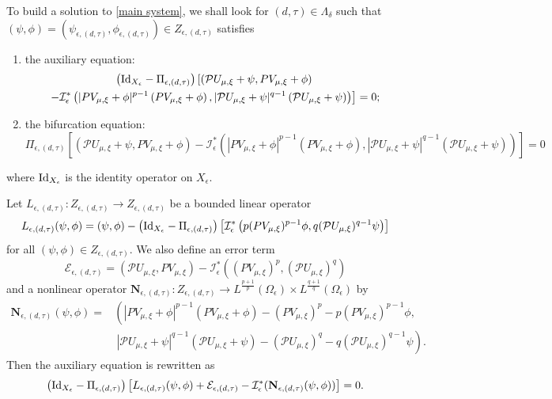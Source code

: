 \documentclass[reqno]{amsart}
\theoremstyle{remark}
\newcommand{\ep}{\epsilon}
\newcommand{\mbN}{\mathbf{N}}
\newcommand{\mce}{\mathcal{E}}
\newcommand{\mci}{\mathcal{I}}
\newcommand{\mcp}{\mathcal{P}}
\newcommand{\mx}{{\mu,\xi}}
\renewcommand{\(}{\left(}
\renewcommand{\)}{\right)}
\numberwithin{equation}{section}
\begin{document}
To build a solution to \eqref{main system}, we shall look for $(d,\tau) \in \Lambda_\delta$ such that $(\psi,\phi) = (\psi_{\ep,(d,\tau)},\phi_{\ep,(d,\tau)}) \in Z_{\ep,(d,\tau)}$ satisfies
\begin{enumerate}
\item the auxiliary equation:
\begin{multline}\label{aux eq}
\(\textup{Id}_{X_\ep}-\Pi_{\ep,(d,\tau)}\) \left[\(\mcp U_\mx+\psi, PV_\mx+\phi\) \right.\\
\left. - \mci^*_\ep\(|PV_\mx+\phi|^{p-1} \(PV_\mx+\phi\), |\mcp U_\mx+\psi|^{q-1} \(\mcp U_\mx+\psi\)\)\right] = 0;
\end{multline}
\item the bifurcation equation:
\[\Pi_{\ep,(d,\tau)} \left[\(\mcp U_\mx+\psi, PV_\mx+\phi\) - \mci^*_\ep\(|PV_\mx+\phi|^{p-1} \(PV_\mx+\phi\), |\mcp U_\mx+\psi|^{q-1} \(\mcp U_\mx+\psi\)\)\right] = 0\]
\end{enumerate}
where $\textup{Id}_{X_\ep}$ is the identity operator on $X_\ep$.

Let $L_{\ep,(d,\tau)}: Z_{\ep,(d,\tau)} \to Z_{\ep,(d,\tau)}$ be a bounded linear operator
\begin{equation}\label{lin op}
L_{\ep,(d,\tau)}(\psi,\phi) = (\psi,\phi) - \(\textup{Id}_{X_\ep}-\Pi_{\ep,(d,\tau)}\) \left[\mci^\ast_\ep\(p(PV_\mx)^{p-1}\phi, q(\mcp U_\mx)^{q-1}\psi\)\right]
\end{equation}
for all $(\psi,\phi) \in Z_{\ep,(d,\tau)}$. We also define an error term
\begin{equation}\label{error}
\mce_{\ep,(d,\tau)} = (\mcp U_\mx,PV_\mx) - \mci^*_\ep\((PV_\mx)^p,(\mcp U_\mx)^q\)
\end{equation}
and a nonlinear operator $\mbN_{\ep,(d,\tau)}: Z_{\ep,(d,\tau)} \to L^{\frac{p+1}{p}}(\Omega_\ep)\times L^{\frac{q+1}{q}}(\Omega_\ep)$ by
\begin{align*}
\mbN_{\ep,(d,\tau)}(\psi,\phi) = & \(|PV_\mx+\phi|^{p-1}\(PV_\mx+\phi\) - (PV_\mx)^p - p(PV_\mx)^{p-1}\phi, \right. \\
&\ \left. |\mcp U_\mx+\psi|^{q-1}\(\mcp U_\mx+\psi\) - (\mcp U_\mx)^q - q(\mcp U_\mx)^{q-1}\psi\).
\end{align*}
Then the auxiliary equation is rewritten as
\begin{equation}\label{aux eq1}
\(\textup{Id}_{X_\ep}-\Pi_{\ep,(d,\tau)}\) \left[L_{\ep,(d,\tau)}(\psi,\phi) + \mce_{\ep,(d,\tau)} - \mci^*_\ep(\mbN_{\ep,(d,\tau)}(\psi,\phi))\right] = 0.
\end{equation}
\end{document}
